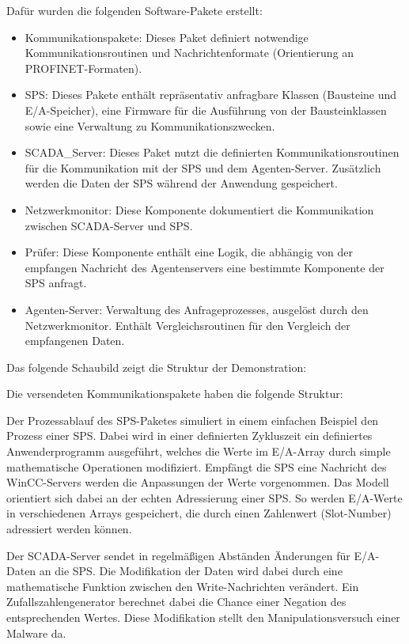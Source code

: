 Dafür wurden die folgenden Software-Pakete erstellt:
\begin{itemize}
\item Kommunikationspakete: Dieses Paket definiert notwendige Kommunikationsroutinen und Nachrichtenformate (Orientierung an PROFINET-Formaten).
\item SPS: Dieses Pakete enthält repräsentativ anfragbare Klassen (Bausteine und E/A-Speicher), eine \glqq Firmware\grqq{} für die Ausführung von der Bausteinklassen sowie eine Verwaltung zu Kommunikationszwecken.
\item SCADA\_Server: Dieses Paket nutzt die definierten Kommunikationsroutinen für die Kommunikation mit der SPS und dem Agenten-Server. Zusätzlich werden die Daten der SPS während der Anwendung gespeichert.
\item Netzwerkmonitor: Diese Komponente dokumentiert die Kommunikation zwischen SCADA-Server und SPS. 
\item Prüfer: Diese Komponente enthält eine Logik, die abhängig von der empfangen Nachricht des Agentenservers eine bestimmte Komponente der SPS anfragt.
\item Agenten-Server: Verwaltung des Anfrageprozesses, ausgelöst durch den Netzwerkmonitor. Enthält Vergleichsroutinen für den Vergleich der empfangenen Daten.
\end{itemize} 

Das folgende Schaubild zeigt die Struktur der Demonstration:

Die versendeten Kommunikationspakete haben die folgende Struktur:

Der Prozessablauf des SPS-Paketes simuliert in einem einfachen Beispiel den Prozess einer SPS. Dabei wird in einer definierten Zykluszeit ein definiertes \glqq Anwenderprogramm\grqq{} ausgeführt, welches die Werte im E/A-Array durch simple mathematische Operationen modifiziert. Empfängt die SPS eine Nachricht des WinCC-Servers werden die Anpassungen der Werte vorgenommen. Das Modell orientiert sich dabei an der echten Adressierung einer SPS. So werden E/A-Werte in verschiedenen Arrays gespeichert, die durch einen Zahlenwert (Slot-Number) adressiert werden können.

Der SCADA-Server sendet in regelmäßigen Abständen Änderungen für E/A-Daten an die SPS. Die Modifikation der Daten wird dabei durch eine mathematische Funktion zwischen den Write-Nachrichten verändert. Ein Zufallszahlengenerator berechnet dabei die Chance einer Negation des entsprechenden Wertes. Diese Modifikation stellt den Manipulationsversuch einer Malware da. 

